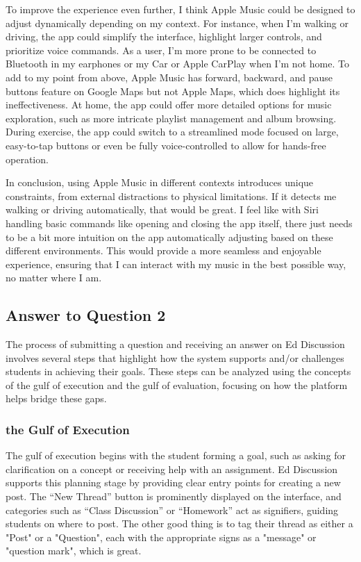 \documentclass[
	letterpaper, %
]{jdf}
\begin{document}
To improve the experience even further, I think Apple Music could be designed to adjust dynamically depending on my context. For instance, when I’m walking or driving, the app could simplify the interface, highlight larger controls, and prioritize voice commands. As a user, I'm more prone to be connected to Bluetooth in my earphones or my Car or Apple CarPlay when I'm not home. To add to my point from above, Apple Music has forward, backward, and pause buttons feature on Google Maps but not Apple Maps, which does highlight its ineffectiveness. At home, the app could offer more detailed options for music exploration, such as more intricate playlist management and album browsing. During exercise, the app could switch to a streamlined mode focused on large, easy-to-tap buttons or even be fully voice-controlled to allow for hands-free operation.

In conclusion, using Apple Music in different contexts introduces unique constraints, from external distractions to physical limitations. If it detects me walking or driving automatically, that would be great. I feel like with Siri handling basic commands like opening and closing the app itself, there just needs to be a bit more intuition on the app automatically adjusting based on these different environments. This would provide a more seamless and enjoyable experience, ensuring that I can interact with my music in the best possible way, no matter where I am. 
\newpage

\subsection{Answer to Question 2}
The process of submitting a question and receiving an answer on Ed Discussion involves several steps that highlight how the system supports and/or challenges students in achieving their goals. These steps can be analyzed using the concepts of the gulf of execution and the gulf of evaluation, focusing on how the platform helps bridge these gaps.

\subsubsection {the Gulf of Execution}
The gulf of execution begins with the student forming a goal, such as asking for clarification on a concept or receiving help with an assignment. Ed Discussion supports this planning stage by providing clear entry points for creating a new post. The “New Thread” button is prominently displayed on the interface, and categories such as “Class Discussion” or “Homework” act as signifiers, guiding students on where to post. The other good thing is to tag their thread as either a "Post" or a "Question", each with the appropriate signs as a "message" or "question mark", which is great. 
\end{document}
